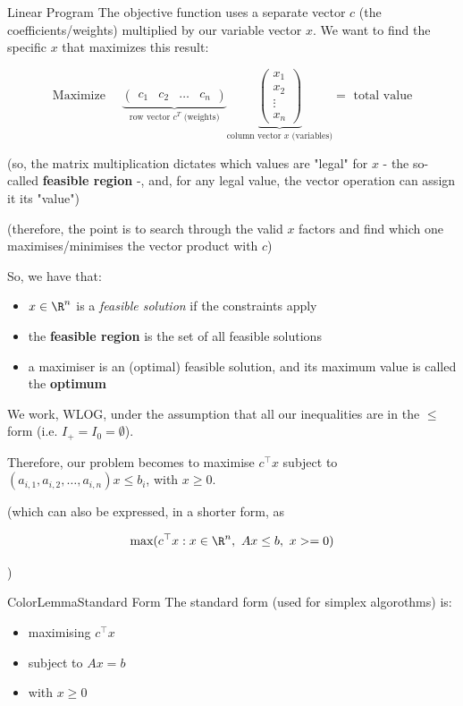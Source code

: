 \documentclass[a4paper, 11pt]{report}
\newcommand{\Rn}{\R^{n}}
\begin{document}
\begin{defframe}{Linear Program}{}
The objective function uses a separate vector $c$ (the coefficients/weights) multiplied by our variable vector $x$. We want to find the specific $x$ that maximizes this result:

$$
\text{Maximize } \quad
\underbrace{
\begin{pmatrix}
    c_1 & c_2 & \dots & c_n
\end{pmatrix}
}_{\text{row vector } c^T \text{ (weights)}}
\underbrace{
\begin{pmatrix}
    x_1 \\ 
    x_2 \\ 
    \vdots \\ 
    x_n
\end{pmatrix}
}_{\text{column vector } x \text{ (variables)}}
= \text{ total value}
$$

\begin{gframe}{}
(so, the matrix multiplication dictates which values are "legal" for $x$ - the so-called \textbf{feasible region} -, and, for any legal value, the vector operation can assign it its "value")

(therefore, the point is to search through the valid $x$ factors and find which one maximises/minimises the vector product with $c$)
\end{gframe}
\end{defframe}

So, we have that:
\begin{itemize}
    \item $x \in \Rn$ is a \textit{feasible solution} if the constraints apply
    \item the \textbf{feasible region} is the set of all feasible solutions
    \item a maximiser is an (optimal) feasible solution, and its maximum value is called the \textbf{optimum} 
\end{itemize}

We work, WLOG, under the assumption that all our inequalities are in the $\leq $ form (i.e. $I_{+} = I_{0} = \emptyset$).

Therefore, our problem becomes to maximise $c^\top  x$ subject to $(a_{i,1}, a_{i,2}, \dots, a_{i,n})x \leq b_{i}$, with $x \geq 0$.

(which can also be expressed, in a shorter form, as

$$\text{max}(c^\top  x : x \in \Rn, \ Ax \leq b, \ x>=0)$$

)

\begin{cframe}{ColorLemma}{Standard Form}
    The standard form (used for simplex algorothms) is:

\begin{itemize}
    \item maximising $c^\top  x$
    \item subject to $Ax = b$
    \item with $x \geq 0$
\end{itemize}
\end{cframe}
\end{document}
